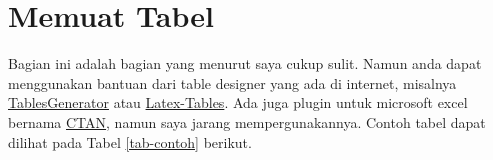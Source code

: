 \documentclass[11pt,a4paper]{article}
\begin{document}
\section{Memuat Tabel}
Bagian ini adalah bagian yang menurut saya cukup sulit. Namun anda dapat menggunakan bantuan dari table designer yang ada di internet, misalnya \href{https://www.tablesgenerator.com}{TablesGenerator} atau \href{https://www.latex-tables.com}{Latex-Tables}. Ada juga plugin untuk microsoft excel bernama \href{https://ctan.org/tex-archive/support/excel2latex?lang=en}{CTAN}, namun saya jarang mempergunakannya. Contoh tabel dapat dilihat pada Tabel \ref{tab-contoh} berikut.

\begin{table}[h]
\caption{Contoh Tabel}
\label{tab-contoh}
\centering
{}
\end{table}
\end{document}
